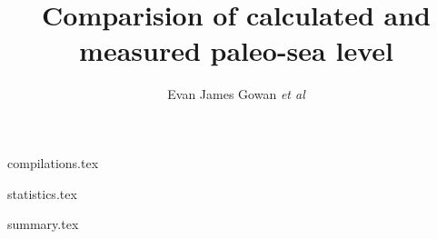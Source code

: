 \documentclass[a4paper,12pt]{article}
\begin{document}
\title{Comparision of calculated and measured paleo-sea level}

\author{Evan James Gowan \emph{et al}}
    
\date{}

\maketitle

\tableofcontents

\newpage

{compilations.tex}

\newpage

{statistics.tex}


\newpage

{summary.tex}

\clearpage

\newpage



\end{document}
